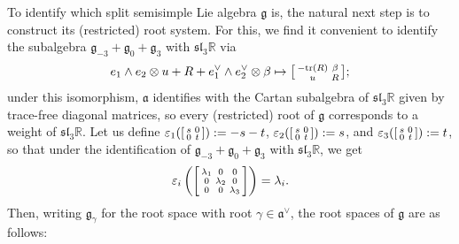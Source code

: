 \documentclass[12pt,a4paper]{amsart}
\theoremstyle{definition}
\newenvironment{smallbmatrix}
  {\left[\begin{smallmatrix}}
  {\end{smallmatrix}\right]}
\begin{document}
To identify which split semisimple Lie algebra $\mathfrak{g}$ is, the natural next step is to construct its (restricted) root system. For this, we find it convenient to identify the subalgebra $\mathfrak{g}_{-3}+\mathfrak{g}_0+\mathfrak{g}_3$ with $\mathfrak{sl}_3\mathbb{R}$ via
\[e_1\wedge e_2\otimes u+R+e_1^\vee\wedge e_2^\vee\otimes\beta\mapsto\begin{smallbmatrix}-\mathrm{tr}(R) & \beta \\ u & R\end{smallbmatrix};\]
under this isomorphism, $\mathfrak{a}$ identifies with the Cartan subalgebra of $\mathfrak{sl}_3\mathbb{R}$ given by trace-free diagonal matrices, so every (restricted) root of $\mathfrak{g}$ corresponds to a weight of $\mathfrak{sl}_3\mathbb{R}$. Let us define $\varepsilon_1(\begin{smallbmatrix}s & 0 \\ 0 & t\end{smallbmatrix}):=-s-t$, $\varepsilon_2(\begin{smallbmatrix}s & 0 \\ 0 & t\end{smallbmatrix}):=s$, and $\varepsilon_3(\begin{smallbmatrix}s & 0 \\ 0 & t\end{smallbmatrix}):=t$, so that under the identification of $\mathfrak{g}_{-3}+\mathfrak{g}_0+\mathfrak{g}_3$ with $\mathfrak{sl}_3\mathbb{R}$, we get
\[\varepsilon_i\left(\begin{smallbmatrix}\lambda_1 & 0 & 0 \\ 0 & \lambda_2 & 0 \\ 0 & 0 & \lambda_3\end{smallbmatrix}\right)=\lambda_i.\]
Then, writing $\mathfrak{g}_\gamma$ for the root space with root $\gamma\in\mathfrak{a}^\vee$, the root spaces of $\mathfrak{g}$ are as follows:
\end{document}
